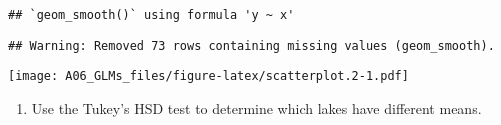 \documentclass[
]{article}
\newenvironment{Shaded}{\begin{snugshade}}{\end{snugshade}}
\newcommand{\CommentTok}[1]{\textcolor[rgb]{0.56,0.35,0.01}{\textit{#1}}}
\newcommand{\DataTypeTok}[1]{\textcolor[rgb]{0.13,0.29,0.53}{#1}}
\newcommand{\DecValTok}[1]{\textcolor[rgb]{0.00,0.00,0.81}{#1}}
\newcommand{\KeywordTok}[1]{\textcolor[rgb]{0.13,0.29,0.53}{\textbf{#1}}}
\newcommand{\NormalTok}[1]{#1}
\newcommand{\OperatorTok}[1]{\textcolor[rgb]{0.81,0.36,0.00}{\textbf{#1}}}
\newcommand{\StringTok}[1]{\textcolor[rgb]{0.31,0.60,0.02}{#1}}
\providecommand{\tightlist}{%
  \setlength{\itemsep}{0pt}\setlength{\parskip}{0pt}}
\begin{document}
\begin{verbatim}
## `geom_smooth()` using formula 'y ~ x'
\end{verbatim}

\begin{verbatim}
## Warning: Removed 73 rows containing missing values (geom_smooth).
\end{verbatim}

\texttt{[image: A06\_GLMs\_files/figure-latex/scatterplot.2-1.pdf]}

\begin{enumerate}
\def\labelenumi{\arabic{enumi}.}
\setcounter{enumi}{14}
\tightlist
\item
  Use the Tukey's HSD test to determine which lakes have different
  means.
\end{enumerate}

\begin{Shaded}
\end{Shaded}
\end{document}
